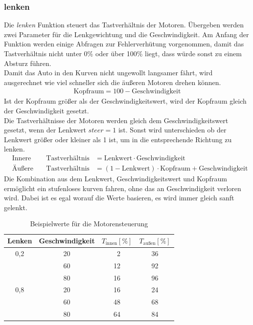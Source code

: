 \documentclass[a4paper, 12pt]{scrartcl}
\begin{document}
\newpage
\subsubsection{lenken}	%


Die \textit{lenken} Funktion steuert das Tastverhältnis der Motoren. Übergeben werden zwei Parameter für die Lenkgewichtung und die Geschwindigkeit.
Am Anfang der Funktion werden einige Abfragen zur Fehlerverhütung vorgenommen, damit das Tastverhältnis nicht unter 0\% oder über 100\% liegt, dass würde sonst zu einem Absturz führen.\\
Damit das Auto in den Kurven nicht ungewollt langsamer fährt, wird ausgerechnet wie viel schneller sich die äußeren  Motoren drehen können.
\begin{align}
	\text{Kopfraum} = 100-\text{Geschwindigkeit}
\end{align}
Ist der Kopfraum größer als der Geschwindigkeitswert, wird der Kopfraum gleich der Geschwindigkeit gesetzt.\\

Die Tastverhältnisse der Motoren werden gleich dem Geschwindigkeitswert gesetzt, wenn der Lenkwert $steer=1$ ist. Sonst wird unterschieden ob der Lenkwert größer oder kleiner als 1 ist, um in die entsprechende Richtung zu lenken.
\begin{align}
	&\text{Innere Motoren:} &\text{Tastverhältnis} &= \text{Lenkwert}\cdot\text{Geschwindigkeit}\\
	&\text{Äußere Motoren:} &\text{Tastverhältnis} &= (1-\text{Lenkwert})\cdot\text{Kopfraum}+\text{Geschwindigkeit}
\end{align}
Die Kombination aus dem Lenkwert, Geschwindigkeitswert und Kopfraum ermöglicht ein stufenloses kurven fahren, ohne das an Geschwindigkeit verloren wird. Dabei ist es egal worauf die Werte basieren, es wird immer gleich sanft gelenkt.

\begin{table}[th!]
	\centering
	\caption{Beispielwerte für die Motorensteuerung}
	\begin{tabular}{c|c|c|c}
		Lenken & Geschwindigkeit & $T_{\text{innen}} [\%]$ &  $T_{\text{au\ss en}}[\%]$ \\ \hline 
		0,2 & 20 & \ 2 & 36 \\  
		    & 60 & 12  & 92 \\    
		    & 80 & 16  & 96 \\ \hline
		0,8 & 20 & 16  & 24 \\
		    & 60 & 48  & 68 \\
		    & 80 & 64  & 84 \\
	\end{tabular} 
\end{table}
\end{document}
